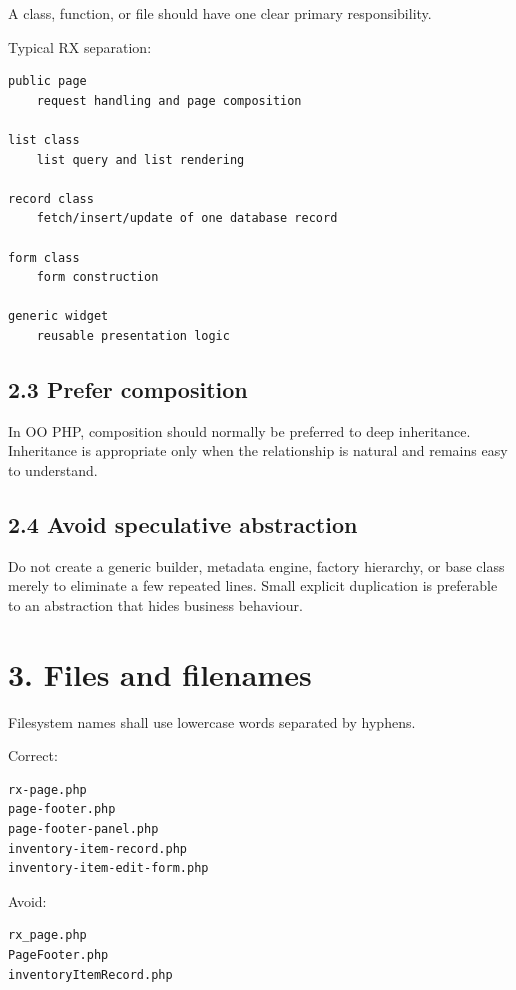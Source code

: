 \documentclass[11pt,a4paper]{article}
\begin{document}
A class, function, or file should have one clear primary responsibility.

Typical RX separation:

\begin{lstlisting}
public page
    request handling and page composition

list class
    list query and list rendering

record class
    fetch/insert/update of one database record

form class
    form construction

generic widget
    reusable presentation logic
\end{lstlisting}

\subsection{2.3 Prefer composition}\label{23-prefer-composition}

In OO PHP, composition should normally be preferred to deep inheritance.
Inheritance is appropriate only when the relationship is natural and
remains easy to understand.

\subsection{2.4 Avoid speculative
abstraction}\label{24-avoid-speculative-abstraction}

Do not create a generic builder, metadata engine, factory hierarchy, or
base class merely to eliminate a few repeated lines. Small explicit
duplication is preferable to an abstraction that hides business
behaviour.

\section{3. Files and filenames}\label{3-files-and-filenames}

Filesystem names shall use lowercase words separated by hyphens.

Correct:

\begin{lstlisting}
rx-page.php
page-footer.php
page-footer-panel.php
inventory-item-record.php
inventory-item-edit-form.php
\end{lstlisting}

Avoid:

\begin{lstlisting}
rx_page.php
PageFooter.php
inventoryItemRecord.php
\end{lstlisting}
\end{document}
